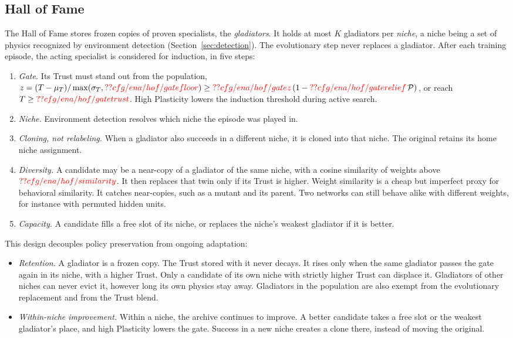 \subsection{Hall of Fame}
\label{sec:hof}
The Hall of Fame stores frozen copies of proven specialists, the \textit{gladiators}. It holds at most $K$ gladiators per \textit{niche}, a niche being a set of physics recognized by environment detection (Section~\ref{sec:detection}). The evolutionary step never replaces a gladiator. After each training episode, the acting specialist is considered for induction, in five steps:
\begin{enumerate}
\item \textit{Gate.} Its Trust must stand out from the population, $z = (T - \mu_T)/\max(\sigma_T, \Res{cfg/ena/hof/gatefloor}) \ge \Res{cfg/ena/hof/gatez}\,(1 - \Res{cfg/ena/hof/gaterelief}\,\mathcal{P})$, or reach $T \ge \Res{cfg/ena/hof/gatetrust}$. High Plasticity lowers the induction threshold during active search.
\item \textit{Niche.} Environment detection resolves which niche the episode was played in.
\item \textit{Cloning, not relabeling.} When a gladiator also succeeds in a different niche, it is cloned into that niche. The original retains its home niche assignment.
\item \textit{Diversity.} A candidate may be a near-copy of a gladiator of the same niche, with a cosine similarity of weights above $\Res{cfg/ena/hof/similarity}$. It then replaces that twin only if its Trust is higher. Weight similarity is a cheap but imperfect proxy for behavioral similarity. It catches near-copies, such as a mutant and its parent. Two networks can still behave alike with different weights, for instance with permuted hidden units.
\item \textit{Capacity.} A candidate fills a free slot of its niche, or replaces the niche's weakest gladiator if it is better.
\end{enumerate}
This design decouples policy preservation from ongoing adaptation:
\begin{itemize}
\item \textit{Retention.} A gladiator is a frozen copy. The Trust stored with it never decays. It rises only when the same gladiator passes the gate again in its niche, with a higher Trust. Only a candidate of its own niche with strictly higher Trust can displace it. Gladiators of other niches can never evict it, however long its own physics stay away. Gladiators in the population are also exempt from the evolutionary replacement and from the Trust blend.
\item \textit{Within-niche improvement.} Within a niche, the archive continues to improve. A better candidate takes a free slot or the weakest gladiator's place, and high Plasticity lowers the gate. Success in a new niche creates a clone there, instead of moving the original.
\end{itemize}
